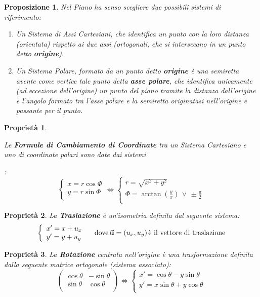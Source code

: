 \documentclass{article}
\newtheorem{property}{Proprietà}[section]
\newtheorem{prop}[defn]{Proposizione}
\begin{document}
\begin{prop}
Nel Piano ha senso scegliere due possibili sistemi di riferimento:
\begin{enumerate}
    \item Un Sistema di Assi Cartesiani, che identifica un punto con la loro distanza (orientata) rispetto ai due assi (ortogonali, che si intersecano in un punto detto \textbf{origine}).
    \item Un Sistema Polare, formato da un punto detto \textbf{origine} è una semiretta avente come vertice tale punto detta \textbf{asse polare}, che identifica unicamente (ad eccezione dell'origine) un punto del piano tramite la distanza dall'origine e l'angolo formato tra l'asse polare e la semiretta originatasi nell'origine e passante per il punto.
\end{enumerate}
\end{prop}
\begin{property}
\hypertarget{formulecoordinate}{
Le \textbf{Formule di Cambiamento di Coordinate} tra un Sistema Cartesiano e uno di coordinate polari sono date dai sistemi}:
\[\left\{
		\begin{array}{l}
			x=r\cos\Phi  \\
			y=r\sin\Phi  \\
		\end{array}
	\right.\iff
	\left\{
		\begin{array}{l}
			r=\sqrt{x^2+y^2}  \\
			\Phi=\arctan\left(\frac{y}{x}\right)\,\vee\,\pm\frac{\pi}{2}  \\
		\end{array}
	\right.\]
\end{property}

\begin{property}
La \textbf{Traslazione} è un'isometria definita dal seguente sistema:
\[\left\{
		\begin{array}{l}
			x'=x+u_x  \\
			y'=y+u_y  \\
		\end{array}
	\right.\quad\text{dove}\, \va{u}=(u_x,u_y)\,\text{è il vettore di traslazione}\]
\end{property}

\begin{property}
La \textbf{Rotazione} centrata nell'origine è una trasformazione definita dalla seguente matrice ortogonale (sistema associato):
\[\begin{pmatrix}\cos\theta&-\sin\theta\\\sin\theta&\cos\theta\\\end{pmatrix}\iff\left\{
\begin{array}{l}
    x'=\cos\theta-y\sin\theta   \\
    y'=x\sin\theta+y\cos\theta   \\
\end{array}\right.\]
\end{property}
\end{document}
